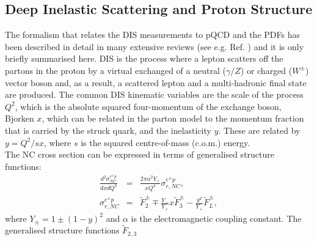


\subsection{Deep Inelastic Scattering and Proton Structure}
\label{dissection}


The for\-ma\-lism that relates the DIS measurements to pQCD and the PDFs has been described
in detail in many extensive reviews (see e.g. Ref. \cite{disbook}) and it is only briefly summarised here.
DIS is the process where a lepton scatters off the partons in the proton
by a virtual exchanged of a neutral ($\gamma/Z$) or charged ($W^{\pm}$) vector boson and, as a result, a scattered lepton and a 
multi-hadronic final state are produced.
The common DIS kinematic variables are the scale of the process $Q^2$, which is the absolute squared four-momentum of 
the exchange boson, Bjorken $x$, 
which can be related in the parton model to 
the momentum fraction that is carried by the struck quark, 
and the inelasticity $y$. These are related by $y=Q^2/sx$, where $s$ is the squared centre-of-mass (c.o.m.) energy.
\\
%
The NC cross section can be expressed in terms of generalised structure functions:
\begin{eqnarray}
    \frac{d^2\sigma_{NC}^{e^{\pm} p}}{dxdQ^2}&=&\frac{2\pi\alpha^2 Y_{+}}{xQ^4} \sigma_{r,NC}^{e^{\pm} p},\\ 
    \sigma_{r,NC}^{e^{\pm} p}&= &  \tilde F_2^{\pm} \mp \frac{Y_{-}}{Y_{+}}x \tilde F_3^{\pm} - \frac{y^2}{Y_{+}} \tilde F_L^{\pm},
\end{eqnarray}
where  $Y_{\pm} = 1 \pm (1-y)^2$ and $\alpha$ is the electromagnetic coupling constant.
The generalised structure functions $\tilde F_{2,3}$ 
